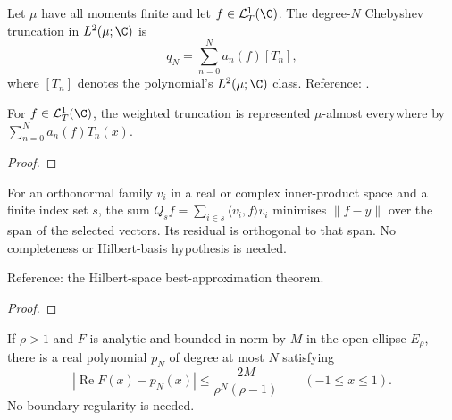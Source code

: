 \begin{supporting}
\begin{definition}
\label{def:complex-chebyshev-competitor}
\leanok
Let $\mu$ have all moments finite and let $f\in\mathcal L^1_T(\C)$.
The degree-$N$ Chebyshev truncation in $L^2(\mu;\C)$ is
\[q_N=\sum_{n=0}^N a_n(f)[T_n],\]
where $[T_n]$ denotes the polynomial's $L^2(\mu;\C)$ class.
Reference: \cite[Theorem 8.2]{atap}.
\end{definition}

\begin{theorem}
\label{thm:complex-chebyshev-competitor}
\leanok
For $f\in\mathcal L^1_T(\C)$, the weighted truncation is represented
$\mu$-almost everywhere by $\sum_{n=0}^N a_n(f)T_n(x)$.
\end{theorem}
\begin{proof}
\leanok
\end{proof}

\begin{theorem}
\label{thm:finite-best-approximation}
\leanok
For an orthonormal family $v_i$ in a real or complex inner-product space and a
finite index set $s$, the sum $Q_s f=\sum_{i\in s}\langle v_i,f\rangle v_i$
minimises $\|f-y\|$ over the span of the selected vectors. Its residual is
orthogonal to that span. No completeness or Hilbert-basis hypothesis is needed.

Reference: the Hilbert-space best-approximation theorem.
\end{theorem}
\begin{proof}
\leanok
\end{proof}

\begin{theorem}
\label{thm:real-analytic-competitor}
\leanok
If $\rho>1$ and $F$ is analytic and bounded in norm by $M$ in the open ellipse
$E_\rho$, there is a real polynomial $p_N$ of degree at most $N$ satisfying
\[ |\operatorname{Re}F(x)-p_N(x)|\le\frac{2M}{\rho^N(\rho-1)}
 \qquad(-1\le x\le1). \]
No boundary regularity is needed.


\end{theorem}
\end{supporting}
